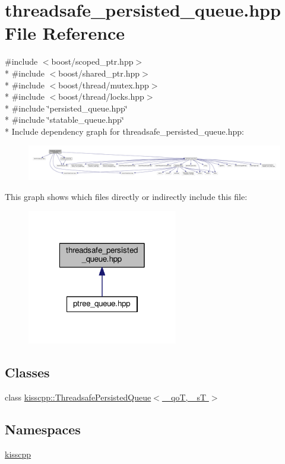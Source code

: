 \hypertarget{a00085}{\section{threadsafe\-\_\-persisted\-\_\-queue.\-hpp File Reference}
\label{a00085}
}
{\ttfamily \#include $<$boost/scoped\-\_\-ptr.\-hpp$>$}\\*
{\ttfamily \#include $<$boost/shared\-\_\-ptr.\-hpp$>$}\\*
{\ttfamily \#include $<$boost/thread/mutex.\-hpp$>$}\\*
{\ttfamily \#include $<$boost/thread/locks.\-hpp$>$}\\*
{\ttfamily \#include \char`\"{}persisted\-\_\-queue.\-hpp\char`\"{}}\\*
{\ttfamily \#include \char`\"{}statable\-\_\-queue.\-hpp\char`\"{}}\\*
Include dependency graph for threadsafe\-\_\-persisted\-\_\-queue.\-hpp\-:\nopagebreak
\begin{figure}[H]
\begin{center}
\leavevmode
\includegraphics[width=350pt]{a00134}
\end{center}
\end{figure}
This graph shows which files directly or indirectly include this file\-:\nopagebreak
\begin{figure}[H]
\begin{center}
\leavevmode
\includegraphics[width=186pt]{a00135}
\end{center}
\end{figure}
\subsection*{Classes}
\begin{DoxyCompactItemize}
\item 
class \hyperlink{a00045}{kisscpp\-::\-Threadsafe\-Persisted\-Queue$<$ \-\_\-qo\-T, \-\_\-s\-T $>$}
\end{DoxyCompactItemize}
\subsection*{Namespaces}
\begin{DoxyCompactItemize}
\item 
\hyperlink{a00089}{kisscpp}
\end{DoxyCompactItemize}

